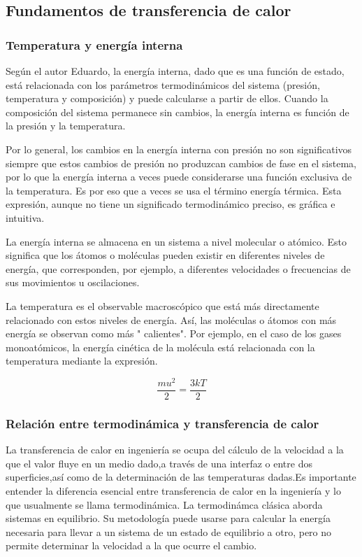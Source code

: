\documentclass[12pt,letterpaper]{article}     %
\begin{document}
\subsection{Fundamentos de transferencia de calor}

\subsubsection{Temperatura y energía interna}
 
Según el autor Eduardo, la energía interna, dado que es una función de estado, está relacionada con los parámetros termodinámicos del sistema (presión, temperatura y composición) y puede calcularse a partir de ellos. Cuando la composición del sistema permanece sin cambios, la energía interna es función de la presión y la temperatura.

Por lo general, los cambios en la energía interna con presión no son significativos siempre que estos cambios de presión no produzcan cambios de fase en el sistema, por lo que la energía interna a veces puede considerarse una función exclusiva de la temperatura. Es por eso que a veces se usa el término energía térmica. Esta expresión, aunque no tiene un significado termodinámico preciso, es gráfica e intuitiva.

La energía interna se almacena en un sistema a nivel molecular o atómico. Esto significa que los átomos o moléculas pueden existir en diferentes niveles de energía, que corresponden, por ejemplo, a diferentes velocidades o frecuencias de sus movimientos u oscilaciones.

La temperatura es el observable macroscópico que está más directamente relacionado con estos niveles de energía. Así, las moléculas o átomos con más energía se observan como más " calientes". Por ejemplo, en el caso de los gases monoatómicos, la energía cinética de la molécula está relacionada con la temperatura mediante la expresión.\cite[p.2-3]{Eduardo} 

\begin{equation}
   \frac {mu^2 }{2} =\frac {3kT }{2}  
    \label{eq:temperature.internalenergy}
\end{equation}

\subsubsection{Relación entre termodinámica y transferencia de calor}

\cite[p\ 4]{Mills} La transferencia de calor en ingeniería se ocupa del cálculo de la velocidad a la que el valor fluye en un medio dado,a través de una interfaz o entre dos superficies,así como de la determinación de las temperaturas dadas.Es importante entender la diferencia esencial entre transferencia de calor en la ingeniería y lo que usualmente se llama termodinámica. La termodinámca clásica aborda sistemas en equilibrio. Su metodología puede usarse para calcular la energía necesaria para llevar a un sistema de un estado de equilibrio a otro, pero no permite determinar la velocidad a la que ocurre el cambio.
\end{document}
